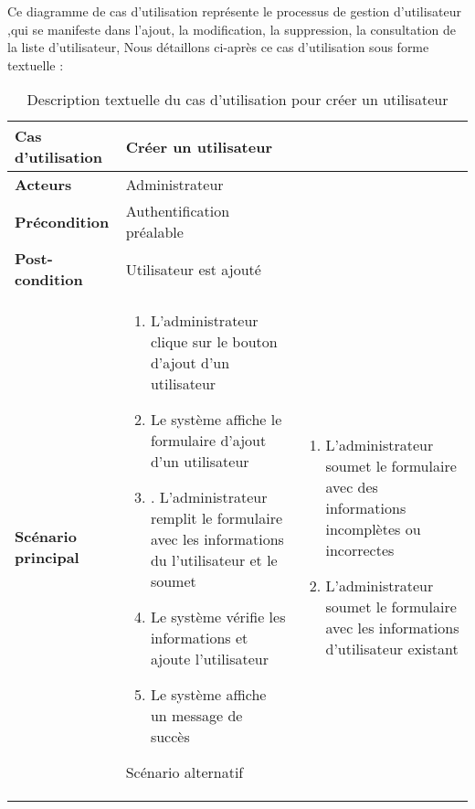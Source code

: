 Ce diagramme de cas d’utilisation représente le processus de gestion d'utilisateur ,qui se manifeste dans l’ajout, la modification, la suppression, la consultation de la liste d'utilisateur, Nous détaillons ci-après ce cas d’utilisation sous forme textuelle :

\begin{longtable}{|>{\bfseries}p{4cm}|p{10cm}|}
\hline
Cas d’utilisation &   Créer un utilisateur \\
\hline
Acteurs & Administrateur \\
\hline
Précondition & Authentification préalable\\
\hline
Post-condition & Utilisateur est ajouté\\
\hline
Scénario principal & 
\begin{enumerate}
  \item  L’administrateur clique sur le bouton d’ajout d’un utilisateur

  \item Le système affiche le formulaire d’ajout d’un utilisateur

  \item . L’administrateur remplit le formulaire avec les informations du l'utilisateur et le soumet 
  \item Le système vérifie les informations et ajoute l'utilisateur
  \item Le système affiche un message de succès
\end{enumerate} 
\hline
Scénario alternatif & 
\begin {enumerate}
\item L’administrateur soumet le formulaire avec des informations incomplètes ou incorrectes
\item L’administrateur soumet le formulaire avec les informations d’utilisateur existant
\end{enumerate} 
 \hline
\caption{Description textuelle du cas d’utilisation pour créer un utilisateur }
\end{longtable}


